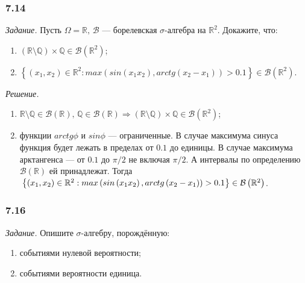 \subsubsection*{7.14}

\textit{Задание.} Пусть $ \Omega = \mathbb{R}, \, \mathcal{B} $ --- борелевская $ \sigma $-алгебра на $ \mathbb{R}^2$.
Докажите, что:
\begin{enumerate}[label=\alph*)]
\item $ \left( \mathbb{R} \setminus \mathbb{Q} \right) \times \mathbb{Q} \in \mathcal{B} \left( \mathbb{R}^2 \right) $;
\item $ \left\{ \left( x_1, x_2 \right) \in \mathbb{R}^2:
max \left( sin \left( x_1 x_2 \right), arctg \left( x_2 - x_1 \right) \right) > 0.1 \right\} \in \mathcal{B} \left( \mathbb{R}^2 \right) $.
\end{enumerate}

\textit{Решение.}
\begin{enumerate}[label=\alph*)]
\item $ \mathbb{R} \setminus \mathbb{Q} \in \mathcal{B} \left( \mathbb{R} \right), \,
\mathbb{Q} \in \mathcal{B} \left( \mathbb{R} \right) \Rightarrow
\left( \mathbb{R} \setminus \mathbb{Q} \right) \times \mathbb{Q} \in \mathcal{B} \left( \mathbb{R}^2 \right) $;
\item функции $arctg \phi $ и $sin \phi $ --- ограниченные.
В случае максимума синуса функция будет лежать в пределах от $0.1$ до единицы.
В случае максимума арктангенса --- от $0.1$ до $ \pi/2$ не включая $ \pi/2$.
А интервалы по определению $ \mathcal{B} \left( \mathbb{R} \right) $ ей принадлежат.
Тогда $ \\
\left\{ \left( x_1, x_2 \right) \in \mathbb{R}^2:
max \left( sin \left( x_1 x_2 \right), arctg \left( x_2 - x_1 \right) \right) > 0.1 \right\} \in \mathcal{B} \left( \mathbb{R}^2 \right) $.
\end{enumerate}

\subsubsection*{7.16}

\textit{Задание.} Опишите $ \sigma $-алгебру, порождённую:
\begin{enumerate}[label=\alph*)]
\item событиями нулевой вероятности;
\item событиями вероятности единица.
\end{enumerate}

